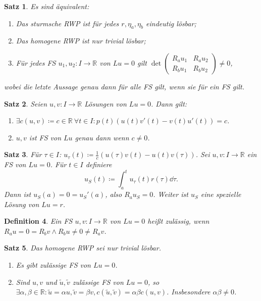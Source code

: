 \documentclass[a4paper]{article}
\newcounter{Sec}
\theoremstyle{marginbreak}
\newtheorem{definition}{Definition}[Sec]
\newtheorem{satz}[definition]{Satz}
\newcommand{\R}{\mathbb{R}}
\begin{document}
	\begin{satz}
		Es sind äquivalent:
		\begin{enumerate}[label=(\alph*)]
			\item Das sturmsche RWP ist für jedes $r,\eta_a,\eta_b$ eindeutig lösbar;
			\item Das homogene RWP ist nur trivial lösbar;
			\item Für jedes FS $u_1, u_2\colon I\to\R$ von $Lu=0$ gilt $\det\begin{pmatrix}
				R_au_1 & R_au_2\\ R_bu_1 & R_bu_2\end{pmatrix}\neq 0$,
		\end{enumerate}
		wobei die letzte Aussage genau dann für alle FS gilt, wenn sie für ein FS gilt.
	\end{satz}
	\begin{satz}
		Seien $u, v\colon I\to\R$ Lösungen von $Lu=0$. Dann gilt:
		\begin{enumerate}[label=(\alph*)]
			\item $\exists c(u,v)\coloneqq c\in\R~\forall t\in I: p(t)(u(t)v'(t) - v(t)u'(t))=c$.
			\item $u, v$ ist FS von $Lu$ genau dann wenn $c\neq 0$.
		\end{enumerate}
	\end{satz}
	\begin{satz}
		Für $\tau\in I$: $u_\tau(t)\coloneqq\frac{1}{c}(u(\tau)v(t)-u(t)v(\tau))$.
		Sei $u, v\colon I\to\R$ ein FS von $Lu=0$. Für $t\in I$ definiere \[u_S(t)\coloneqq\int_a^tu_\tau(t)r(\tau)\dd{\tau}.\]
		Dann ist $u_S(a)=0=u_S'(a)$, also $R_au_S=0$. Weiter ist $u_S$ eine spezielle Lösung von $Lu=r$.
	\end{satz}
	\begin{definition}
		Ein FS $u, v\colon I\to\R$ von $Lu=0$ heißt zulässig, wenn $R_au=0=R_bv\wedge R_bu\neq 0\neq R_av$.
	\end{definition}
	\begin{satz}
		Das homogene RWP sei nur trivial lösbar.
		\begin{enumerate}[label=(\alph*)]
			\item Es gibt zulässige FS von $Lu=0$.
			\item Sind $u, v$ und $\tilde{u},\tilde{v}$ zulässige FS von $Lu=0$, so
				$\exists\alpha,\beta\in\R:\tilde{u}=\alpha u, \tilde{v}=\beta v,
				c(\tilde{u},\tilde{v})=\alpha\beta c(u, v)$. Insbesondere $\alpha\beta\neq 0$.
		\end{enumerate}
	\end{satz}
\end{document}
